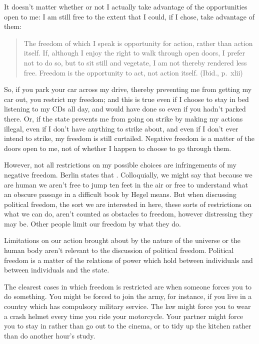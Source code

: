\documentclass[letterpaper,10pt,english]{sphinxmanual}
\begin{document}
It doesn’t matter whether or not I actually take advantage of the opportunities open to me: I am still free to the extent that I could, if I chose, take advantage of them:


\begin{quote}

The freedom of which I speak is opportunity for action, rather than action itself. If, although I enjoy the right to walk through open doors, I prefer not to do so, but to sit still and vegetate, I am not thereby rendered less free. Freedom is the opportunity to act, not action itself. (Ibid., p. xlii)
\end{quote}

So, if you park your car across my drive, thereby preventing me from getting my car out, you restrict my freedom; and this is true even if I choose to stay in bed listening to my CDs all day, and would have done so even if you hadn’t parked there. Or, if the state prevents me from going on strike by making my actions illegal, even if I don’t have anything to strike about, and even if I don’t ever intend to strike, my freedom is still curtailed. Negative freedom is a matter of the doors open to
me, not of whether I happen to choose to go through them.

However, not all restrictions on my possible choices are infringements of my negative freedom. Berlin states that . Colloquially, we might say that because we are human we aren’t free to jump ten feet in the air or free to understand what an obscure passage in a difficult book by Hegel means. But when discussing political freedom, the sort we are interested in here, these sorts of restrictions on what we can do, aren’t counted as
obstacles to freedom, however distressing they may be. Other people limit our freedom by what they do.

Limitations on our action brought about by the nature of the universe or the human body aren’t relevant to the discussion of political freedom. Political freedom is a matter of the relations of power which hold between individuals and between individuals and the state.

The clearest cases in which freedom is restricted are when someone forces you to do something. You might be forced to join the army, for instance, if you live in a country which has compulsory military service. The law might force you to wear a crash helmet every time you ride your motorcycle. Your partner might force you to stay in rather than go out to the cinema, or to tidy up the kitchen rather than do another hour’s study.
\end{document}
